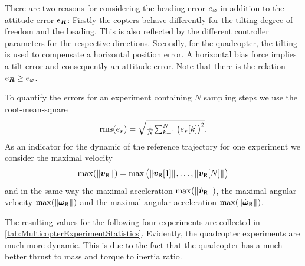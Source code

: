 There are two reasons for considering the heading error $e_{\varphi}$ in addition to the attitude error $e_{\boldsymbol{R}}$:
Firstly the copters behave differently for the tilting degree of freedom and the heading.
This is also reflected by the different controller parameters for the respective directions.
Secondly, for the quadcopter, the tilting is used to compensate a horizontal position error.
A horizontal bias force implies a tilt error and consequently an attitude error.
Note that there is the relation $e_{\boldsymbol{R}} \geq e_{\varphi}$.

To quantify the errors for an experiment containing $N$ sampling steps we use the root-mean-square
\begin{align}
 \operatorname{rms}(e_{\boldsymbol{r}}) = \sqrt{ \tfrac{1}{N} \textstyle{\sum_{k=1}^{N} \big( e_{\boldsymbol{r}}[k] \big)^2} }.
\end{align}
As an indicator for the dynamic of the reference trajectory for one experiment we consider the maximal velocity
\begin{align}
 \max(\| \boldsymbol{v}_{\mathsf{R}} \|_{}) = \max\big( \| \boldsymbol{v}_{\mathsf{R}}[1] \|_{}, \ldots, \| \boldsymbol{v}_{\mathsf{R}}[N] \|_{} \big)
\end{align}
and in the same way the maximal acceleration $\max(\| \dot{\boldsymbol{v}}_{\mathsf{R}} \|_{})$, the maximal angular velocity $\max(\| \boldsymbol{\omega}_{\mathsf{R}} \|_{})$ and the maximal angular acceleration $\max(\| \dot{\boldsymbol{\omega}}_{\mathsf{R}} \|_{})$.

The resulting values for the following four experiments are collected in \autoref{tab:MulticopterExperimentStatistics}.
Evidently, the quadcopter experiments are much more dynamic.
This is due to the fact that the quadcopter has a much better thrust to mass and torque to inertia ratio.

